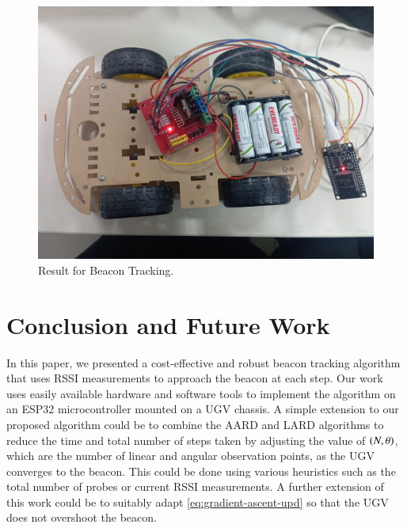 \documentclass[conference]{IEEEtran}
\begin{document}
\begin{figure}[t]
    \centering
    \includegraphics[width=\columnwidth]{output.jpg}
    \caption{Result for Beacon Tracking.}
    \label{fig:beacon hardware}
\end{figure}

\section{Conclusion and Future Work}
\label{sec:conclusion}

In this paper, we presented a cost-effective and robust beacon tracking
algorithm that uses RSSI measurements to approach the beacon at each step. Our
work uses easily available hardware and software tools to implement the
algorithm on an ESP32 microcontroller mounted on a UGV chassis. A simple
extension to our proposed algorithm could be to combine the AARD and LARD
algorithms to reduce the time and total number of steps taken by adjusting the
value of $\left(N, \theta\right)$, which are the number of linear and angular observation points, as the UGV converges to the beacon. This could be done
using various heuristics such as the total number of probes or current RSSI
measurements. A further extension of this work could be to suitably adapt
\eqref{eq:gradient-ascent-upd} so that the UGV does not overshoot the beacon.
%


\end{document}
